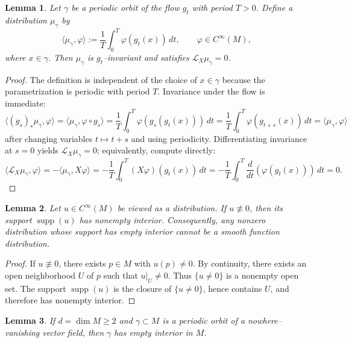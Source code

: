 \documentclass[11pt]{article}
\newtheorem{lemma}{Lemma}
\theoremstyle{definition}
\theoremstyle{remark}
\newcommand{\Lie}{\mathcal{L}}
\newcommand{\supp}{\operatorname{supp}}
\begin{document}
\begin{lemma}\label{lem:orbitMeasureInvariant}
Let $\gamma$ be a periodic orbit of the flow $g_t$ with period $T>0$. Define a distribution $\mu_\gamma$ by
\begin{equation}\label{eq:orbitmeasure}
 \langle \mu_\gamma,\varphi\rangle := \frac{1}{T}\int_0^T \varphi(g_t(x))\,dt,\qquad \varphi\in C^\infty(M),
\end{equation}
where $x\in \gamma$. Then $\mu_\gamma$ is $g_t$--invariant and satisfies $\Lie_X \mu_\gamma=0$.
\end{lemma}

\begin{proof}
The definition is independent of the choice of $x\in\gamma$ because the parametrization is periodic with period $T$.
Invariance under the flow is immediate:
\[
\langle (g_s)_*\mu_\gamma,\varphi\rangle
=\langle \mu_\gamma,\varphi\circ g_s\rangle
=\frac{1}{T}\int_0^T \varphi(g_s(g_t(x)))\,dt
=\frac{1}{T}\int_0^T \varphi(g_{t+s}(x))\,dt
=\langle \mu_\gamma,\varphi\rangle
\]
after changing variables $t\mapsto t+s$ and using periodicity.
Differentiating invariance at $s=0$ yields $\Lie_X\mu_\gamma=0$; equivalently, compute directly:
\[
\langle \Lie_X\mu_\gamma,\varphi\rangle
= -\langle \mu_\gamma, X\varphi\rangle
= -\frac{1}{T}\int_0^T (X\varphi)(g_t(x))\,dt
= -\frac{1}{T}\int_0^T \frac{d}{dt}(\varphi(g_t(x)))\,dt
=0.
\]
\end{proof}

\begin{lemma}\label{lem:smoothDistributionSupport}
Let $u\in C^\infty(M)$ be viewed as a distribution. If $u\not\equiv 0$, then its support $\supp(u)$ has nonempty interior.
Consequently, any nonzero distribution whose support has empty interior cannot be a smooth function distribution.
\end{lemma}

\begin{proof}
If $u\not\equiv 0$, there exists $p\in M$ with $u(p)\neq 0$.
By continuity, there exists an open neighborhood $U$ of $p$ such that $u|_U\neq 0$.
Thus $\{u\neq 0\}$ is a nonempty open set. The support $\supp(u)$ is the closure of $\{u\neq 0\}$, hence contains $U$,
and therefore has nonempty interior.
\end{proof}

\begin{lemma}\label{lem:periodicOrbitEmptyInterior}
If $d=\dim M\ge 2$ and $\gamma\subset M$ is a periodic orbit of a nowhere--vanishing vector field,
then $\gamma$ has empty interior in $M$.
\end{lemma}
\end{document}

